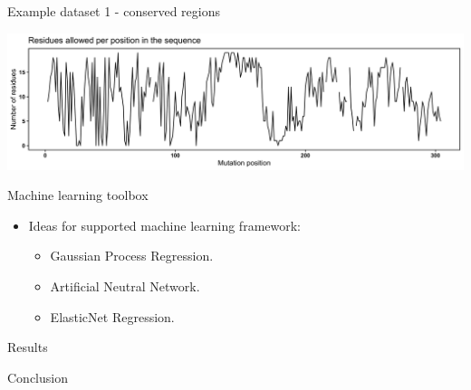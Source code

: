 \documentclass[ignorenonframetext,]{beamer}
\providecommand{\tightlist}{%
  \setlength{\itemsep}{0pt}\setlength{\parskip}{0pt}}
\begin{document}
\begin{frame}{Example dataset 1 - conserved regions}
\protect\hypertarget{example-dataset-1---conserved-regions}{}

\includegraphics[width=1\textwidth,height=\textheight]{quick_SAR/quick_sar_data_set_1.png}

\end{frame}

\begin{frame}{Machine learning toolbox}
\protect\hypertarget{machine-learning-toolbox}{}

\begin{itemize}
\item
  Ideas for supported machine learning framework:

  \begin{itemize}
  \tightlist
  \item
    Gaussian Process Regression.
  \item
    Artificial Neutral Network.
  \item
    ElasticNet Regression.
  \end{itemize}
\end{itemize}

\end{frame}

\begin{frame}{Results}
\protect\hypertarget{results}{}

\end{frame}

\begin{frame}{Conclusion}
\protect\hypertarget{conclusion}{}

\end{frame}
\end{document}
